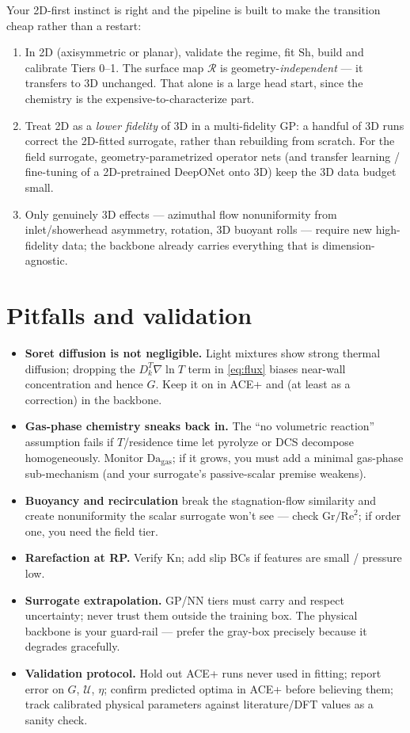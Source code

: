 \documentclass[11pt]{article}
\newcommand{\R}{\mathcal{R}}
\newcommand{\Da}{\mathrm{Da}}
\newcommand{\Sh}{\mathrm{Sh}}
\newcommand{\Rey}{\mathrm{Re}}
\newcommand{\Kn}{\mathrm{Kn}}
\newcommand{\Gr}{\mathrm{Gr}}
\begin{document}
Your 2D-first instinct is right and the pipeline is built to make the transition cheap rather than a restart:
\begin{enumerate}[leftmargin=1.4em,itemsep=2pt]
\item In 2D (axisymmetric or planar), validate the regime, fit $\Sh$, build and calibrate Tiers 0--1. The surface map $\R$ is geometry-\emph{independent} --- it transfers to 3D unchanged. That alone is a large head start, since the chemistry is the expensive-to-characterize part.
\item Treat 2D as a \emph{lower fidelity} of 3D in a multi-fidelity GP: a handful of 3D runs correct the 2D-fitted surrogate, rather than rebuilding from scratch. For the field surrogate, geometry-parametrized operator nets (and transfer learning / fine-tuning of a 2D-pretrained DeepONet onto 3D) keep the 3D data budget small.
\item Only genuinely 3D effects --- azimuthal flow nonuniformity from inlet/showerhead asymmetry, rotation, 3D buoyant rolls --- require new high-fidelity data; the backbone already carries everything that is dimension-agnostic.
\end{enumerate}

\section{Pitfalls and validation}
\label{sec:pitfalls}

\begin{itemize}[leftmargin=1.4em,itemsep=2pt]
\item \textbf{Soret diffusion is not negligible.} Light  mixtures show strong thermal diffusion; dropping the $D_k^T\nabla\ln T$ term in \eqref{eq:flux} biases near-wall concentration and hence $G$. Keep it on in ACE+ and (at least as a correction) in the backbone.
\item \textbf{Gas-phase chemistry sneaks back in.} The ``no volumetric reaction'' assumption fails if $T$/residence time let  pyrolyze or DCS decompose homogeneously. Monitor $\Da_{\text{gas}}$; if it grows, you must add a minimal gas-phase sub-mechanism (and your surrogate's passive-scalar premise weakens).
\item \textbf{Buoyancy and recirculation} break the stagnation-flow similarity and create nonuniformity the scalar surrogate won't see --- check $\Gr/\Rey^2$; if order one, you need the field tier.
\item \textbf{Rarefaction at RP.} Verify $\Kn$; add slip BCs if features are small / pressure low.
\item \textbf{Surrogate extrapolation.} GP/NN tiers must carry and respect uncertainty; never trust them outside the training box. The physical backbone is your guard-rail --- prefer the gray-box precisely because it degrades gracefully.
\item \textbf{Validation protocol.} Hold out ACE+ runs never used in fitting; report error on $G$, $\mathcal U$, $\eta$; confirm predicted optima in ACE+ before believing them; track calibrated physical parameters against literature/DFT values as a sanity check.
\end{itemize}
\end{document}
